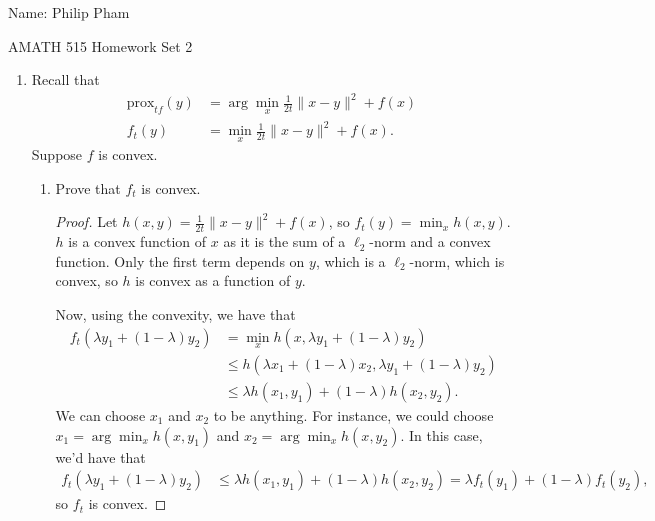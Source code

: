 \documentclass[11pt]{amsart}
\begin{document}
{\Large Name: Philip Pham}  \\
\begin{center}
\Large AMATH 515 \hskip 2in Homework Set 2\\
\end{center}

\begin{enumerate}



\item Recall that 
\[
\begin{aligned}
\mbox{prox}_{t f}(y) &= \arg\min_{x} \frac{1}{2t}\|x-y\|^2 + f(x)\\
f_t(y) &= \min_x \frac{1}{2t}\|x-y\|^2 + f(x).
\end{aligned}
\] 
Suppose $f$ is convex. 
\begin{enumerate}

\item Prove that $f_t$ is convex.
  \begin{proof}
    Let $h(x, y) = \frac{1}{2t}\|x-y\|^2 + f(x)$, so $f_t(y) = \min_x h(x,
    y)$. $h$ is a convex function of $x$ as it is the sum of a $\ell_2$-norm and
    a convex function. Only the first term depends on $y$, which is a
    $\ell_2$-norm, which is convex, so $h$ is convex as a function of $y$.

    Now, using the convexity, we have that
    \begin{align*}
      f_t\left(\lambda y_1 + (1-\lambda)y_2\right)
      &= \min_x h\left(x, \lambda y_1 + (1-\lambda)y_2\right) \\
      &\leq h\left(\lambda x_1 + (1-\lambda)x_2, \lambda y_1 + (1-\lambda)y_2\right) \\
      &\leq \lambda h\left(x_1, y_1\right) + (1-\lambda)h\left(x_2, y_2\right).
    \end{align*}
    We can choose $x_1$ and $x_2$ to be anything. For instance, we could choose
    $x_1 = \arg\min_{x} h\left(x, y_1\right)$ and
    $x_2 = \arg\min_{x} h\left(x, y_2\right)$. In this case, we'd have that
    \begin{align*}
      f_t\left(\lambda y_1 + (1-\lambda)y_2\right)
      &\leq \lambda h\left(x_1, y_1\right) + (1-\lambda)h\left(x_2, y_2\right)
        = \lambda f_t\left(y_1\right) + \left(1 - \lambda\right) f_t\left(y_2\right),
    \end{align*}
    so $f_t$ is convex.
  \end{proof}
  

\end{enumerate}
\end{enumerate}
\end{document}
